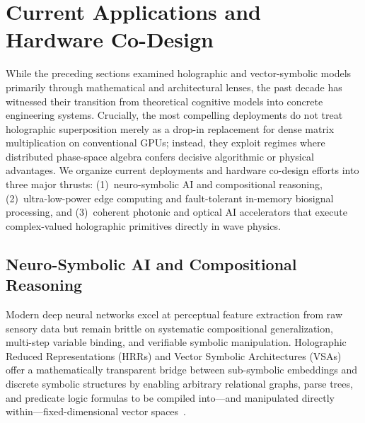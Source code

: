 \section{Current Applications and Hardware Co-Design}\label{sec:applications}

While the preceding sections examined holographic and vector-symbolic models primarily through mathematical and architectural lenses, the past decade has witnessed their transition from theoretical cognitive models into concrete engineering systems.
Crucially, the most compelling deployments do not treat holographic superposition merely as a drop-in replacement for dense matrix multiplication on conventional GPUs; instead, they exploit regimes where distributed phase-space algebra confers decisive algorithmic or physical advantages.
We organize current deployments and hardware co-design efforts into three major thrusts: (1)~neuro-symbolic AI and compositional reasoning, (2)~ultra-low-power edge computing and fault-tolerant in-memory biosignal processing, and (3)~coherent photonic and optical AI accelerators that execute complex-valued holographic primitives directly in wave physics.

\subsection{Neuro-Symbolic AI and Compositional Reasoning}\label{sec:applications:neurosymbolic}

Modern deep neural networks excel at perceptual feature extraction from raw sensory data but remain brittle on systematic compositional generalization, multi-step variable binding, and verifiable symbolic manipulation.
Holographic Reduced Representations (HRRs) and Vector Symbolic Architectures (VSAs) offer a mathematically transparent bridge between sub-symbolic embeddings and discrete symbolic structures by enabling arbitrary relational graphs, parse trees, and predicate logic formulas to be compiled into---and manipulated directly within---fixed-dimensional vector spaces~\cite{PLATE_1995_HRR,KLEYKO_VSA_SURVEY}.

